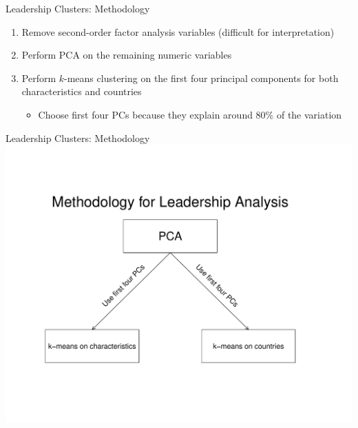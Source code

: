 \documentclass[
  ignorenonframetext,
]{beamer}
\providecommand{\tightlist}{%
  \setlength{\itemsep}{0pt}\setlength{\parskip}{0pt}}
\begin{document}
\begin{frame}{Leadership Clusters: Methodology}
\protect\hypertarget{leadership-clusters-methodology}{}
\begin{enumerate}
\item
  Remove second-order factor analysis variables (difficult for
  interpretation)
\item
  Perform PCA on the remaining numeric variables
\item
  Perform \(k\)-means clustering on the first four principal components
  for both characteristics and countries

  \begin{itemize}
  \tightlist
  \item
    Choose first four PCs because they explain around 80\% of the
    variation
  \end{itemize}
\end{enumerate}
\end{frame}

\begin{frame}{Leadership Clusters: Methodology}
\protect\hypertarget{leadership-clusters-methodology-1}{}
\includegraphics{final_slides_files/figure-beamer/leader_methods-1.pdf}
\end{frame}
\end{document}
